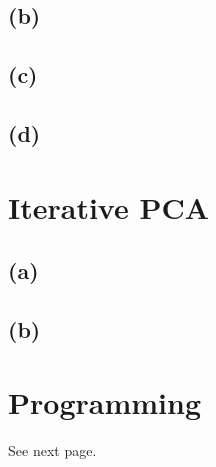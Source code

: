 \documentclass{article}
\begin{document}
\subsection*{(b)}
\subsection*{(c)}
\subsection*{(d)}


\section{Iterative PCA}

\subsection*{(a)}


\subsection*{(b)}


\section*{Programming}
See next page.

%

%

\end{document}
